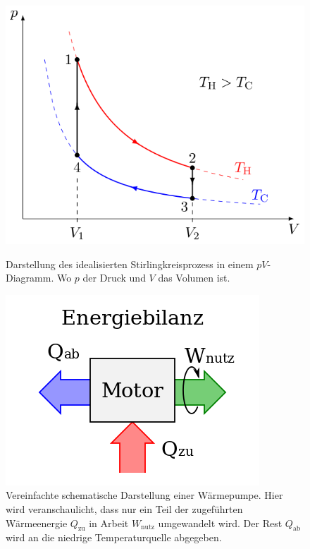 \documentclass[11pt]{scrartcl}
\begin{document}
\begin{figure}[H]
    \begin{center}
        \begin{minipage}[htbp]{.4\linewidth} %
            \includegraphics[width=0.925\linewidth]{pics/Stirling_cycle_pV.svg.png}
            \caption[Kreisprozess des Stirlingmotors]{Darstellung des 
            idealisierten Stirlingkreisprozess in einem $pV$-Diagramm.
            Wo $p$ der Druck und $V$ das Volumen ist.}
            \label{fig:Kreisprozess_Ideal}
        \end{minipage}
        \hspace{.1\linewidth}%
        \begin{minipage}[htbp]{.4\linewidth} %
            \includegraphics[width=\linewidth]{pics/Energiebilanz_Motor.svg.png}
            \caption[Wärmepumpe Darstellung]{Vereinfachte schematische 
            Darstellung einer Wärmepumpe. Hier wird veranschaulicht, dass
            nur ein Teil der zugeführten Wärmeenergie $Q_{\text{zu}}$ in Arbeit $W_{\text{nutz}}$
            umgewandelt wird. Der Rest $Q_{\text{ab}}$ wird an die niedrige Temperaturquelle
            abgegeben.}
            \label{fig:Wärmepumpe}
        \end{minipage}
    \end{center}
 \end{figure}
\end{document}
